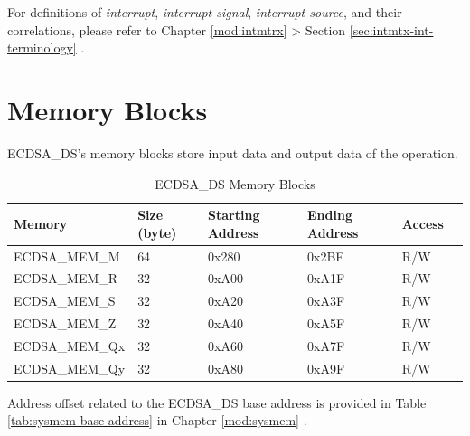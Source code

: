 \documentclass[main\_\_EN.tex]{subfiles}
\begin{document}
\begin{tiplisting}
For definitions of \textit{interrupt}, \textit{interrupt signal}, \textit{interrupt source}, and their correlations, please refer to Chapter \ref{mod:intmtrx} \textit{} > Section \ref{sec:intmtx-int-terminology} \textit{}.
\end{tiplisting}


\section{Memory Blocks}

ECDSA\_DS's memory blocks store input data and output data of the operation.

\begin{table}[H]
    \centering
    \caption{ECDSA\_DS Memory Blocks} \label{tab:ecdsa-memory}
    \begin{threeparttable}
    \begin{tabular}{ | l | l | l | l | l | l | }
    \hline
        \rowcolor{lightgray}
        \textbf{Memory} & \textbf{Size (byte)}  &  \textbf{Starting Address}\tnote{*} &  \textbf{Ending Address} \tnote{*} & \textbf{Access}   \\ \hline
        ECDSA\_MEM\_M    & 64  & 0x280 & 0x2BF & R/W \\ \hline
        ECDSA\_MEM\_R    & 32  & 0xA00 & 0xA1F & R/W \\ \hline
        ECDSA\_MEM\_S    & 32  & 0xA20 & 0xA3F & R/W \\ \hline
        ECDSA\_MEM\_Z    & 32  & 0xA40 & 0xA5F & R/W \\ \hline
        ECDSA\_MEM\_Qx   & 32  & 0xA60 & 0xA7F & R/W \\ \hline
        ECDSA\_MEM\_Qy   & 32  & 0xA80 & 0xA9F & R/W \\ \hline
    \end{tabular}
    \begin{tablenotes}
        \item[*] Address offset related to the ECDSA\_DS base address is provided in Table \ref{tab:sysmem-base-address} in Chapter \ref{mod:sysmem} \textit{}.
    \end{tablenotes}
    \end{threeparttable}
\end{table}


\end{document}
